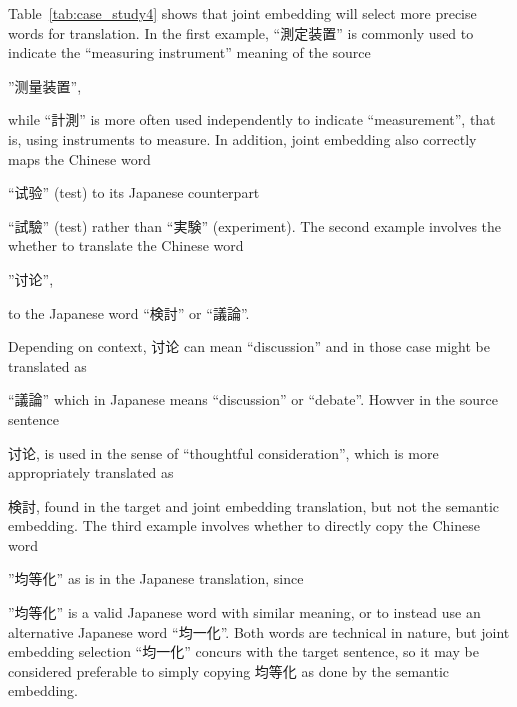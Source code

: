 \begin{CJK}{UTF8}{ipxm}
    Table~\ref{tab:case_study4} shows that joint embedding will select more precise words for translation.
In the first example, ``測定装置'' is commonly used to indicate the ``measuring instrument'' meaning of the source
\end{CJK}\begin{CJK}{UTF8}{gbsn}''测量装置'',
\end{CJK}\begin{CJK}{UTF8}{ipxm}
while ``計測'' is more often used independently to indicate ``measurement'', that is, using instruments to measure. In addition, joint embedding also correctly maps the Chinese word
\end{CJK}\begin{CJK}{UTF8}{gbsn}``试验'' (test) to its Japanese counterpart
\end{CJK}\begin{CJK}{UTF8}{ipxm}``試驗'' (test) rather than ``実験'' (experiment).
The second example involves the whether to translate the Chinese word
\end{CJK}\begin{CJK}{UTF8}{gbsn}''讨论'',
\end{CJK}\begin{CJK}{UTF8}{ipxm}
to the Japanese word ``検討'' or ``議論''.
\end{CJK}\begin{CJK}{UTF8}{gbsn} Depending on context, 讨论 can mean ``discussion'' and in those case might be translated as
\end{CJK}\begin{CJK}{UTF8}{ipxm}``議論'' which in Japanese means ``discussion'' or ``debate''.
Howver in the source sentence
\end{CJK}\begin{CJK}{UTF8}{gbsn}
讨论, is used in the sense of ``thoughtful consideration'', which is more appropriately translated as
\end{CJK}\begin{CJK}{UTF8}{ipxm}
検討, found in the target and joint embedding translation, but not the semantic embedding.
The third example involves whether to directly copy the Chinese word
\end{CJK}\begin{CJK}{UTF8}{gbsn}''均等化''
as is in the Japanese translation, since
\end{CJK}\begin{CJK}{UTF8}{ipxm}''均等化'' is a valid Japanese word with similar meaning,
or to instead use an alternative Japanese word \mbox{``均一化''}.
Both words are technical in nature, but joint embedding selection ``均一化'' concurs with the target sentence, so it may be considered preferable to simply copying \mbox{均等化} as done by the semantic embedding.
\end{CJK}


